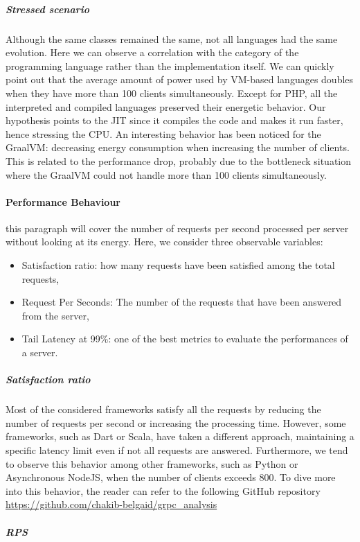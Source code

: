 \subparagraph{Stressed scenario}
Although the same classes remained the same, not all languages had the same evolution. Here we can observe a correlation with the category of the programming language rather than the implementation itself.
We can quickly point out that the average amount of power used by VM-based languages doubles when they have more than 100 clients simultaneously.
Except for PHP, all the interpreted and compiled languages preserved their energetic behavior.
Our hypothesis points to the JIT since it compiles the code and makes it run faster, hence stressing the CPU.
An interesting behavior has been noticed for the GraalVM: decreasing energy consumption when increasing the number of clients.
This is related to the performance drop, probably due to the bottleneck situation where the GraalVM could not handle more than 100 clients simultaneously.

\paragraph{Performance Behaviour}
this paragraph will cover the number of requests per second processed per server without looking at its energy.
Here, we consider three observable variables:
\begin{itemize}
    \item \textsf{Satisfaction ratio}: how many requests have been satisfied among the total requests,
    \item \textsf{Request Per Seconds}: The number of the requests that have been answered from the server,
    \item \textsf{Tail Latency at 99\%}: one of the best metrics to evaluate the performances of a server.
\end{itemize}

\subparagraph{Satisfaction ratio}
Most of the considered frameworks satisfy all the requests by reducing the number of requests per second or increasing the processing time.
However, some frameworks, such as Dart or Scala, have taken a different approach, maintaining a specific latency limit even if not all requests are answered.
Furthermore, we tend to observe this behavior among other frameworks, such as Python or Asynchronous NodeJS, when the number of clients exceeds 800. To dive more into this behavior, the reader can refer to the following  GitHub repository \url{https://github.com/chakib-belgaid/grpc_analysis}

\subparagraph{RPS}

